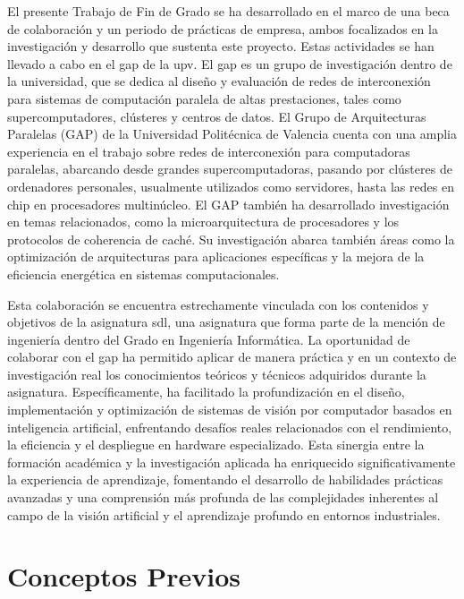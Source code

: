 \documentclass[11pt,spanish,listoffigures,listoftables]{tfgetsinf}
\begin{document}
El presente Trabajo de Fin de Grado se ha desarrollado en el marco de una beca de colaboración y un periodo de prácticas de empresa, ambos focalizados en la investigación y desarrollo que sustenta este proyecto. Estas actividades se han llevado a cabo en el \gls{gap} de la \gls{upv}. El \gls{gap} es un grupo de investigación dentro de la universidad, que se dedica al diseño y evaluación de redes de interconexión para sistemas de computación paralela de altas prestaciones, tales como supercomputadores, clústeres y centros de datos. El Grupo de Arquitecturas Paralelas (GAP) de la Universidad Politécnica de Valencia cuenta con una amplia experiencia en el trabajo sobre redes de interconexión para computadoras paralelas, abarcando desde grandes supercomputadoras, pasando por clústeres de ordenadores personales, usualmente utilizados como servidores, hasta las redes en chip en procesadores multinúcleo. El GAP también ha desarrollado investigación en temas relacionados, como la microarquitectura de procesadores y los protocolos de coherencia de caché. Su investigación abarca también áreas como la optimización de arquitecturas para aplicaciones específicas y la mejora de la eficiencia energética en sistemas computacionales.

Esta colaboración se encuentra estrechamente vinculada con los contenidos y objetivos de la asignatura \gls{sdl}, una asignatura que forma parte de la mención de ingeniería dentro del Grado en Ingeniería Informática. La oportunidad de colaborar con el \gls{gap} ha permitido aplicar de manera práctica y en un contexto de investigación real los conocimientos teóricos y técnicos adquiridos durante la asignatura. Específicamente, ha facilitado la profundización en el diseño, implementación y optimización de sistemas de visión por computador basados en inteligencia artificial, enfrentando desafíos reales relacionados con el rendimiento, la eficiencia y el despliegue en hardware especializado. Esta sinergia entre la formación académica y la investigación aplicada ha enriquecido significativamente la experiencia de aprendizaje, fomentando el desarrollo de habilidades prácticas avanzadas y una comprensión más profunda de las complejidades inherentes al campo de la visión artificial y el aprendizaje profundo en entornos industriales.

\chapter{Conceptos Previos} \label{chap:conceptos_previos}
\end{document}
